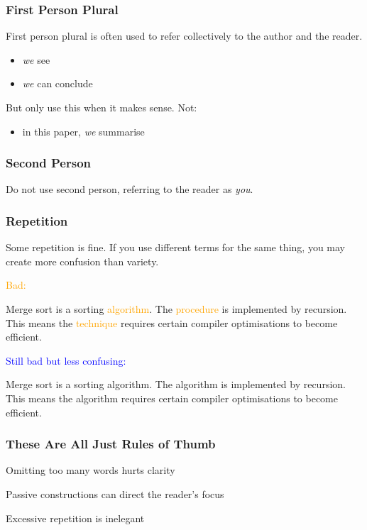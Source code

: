 \documentclass[xetex]{beamer}
\newcommand{\bad}[1]{\textcolor{orange}{#1}}
\newcommand{\good}[1]{\textcolor{blue}{#1}}
\begin{document}
\begin{frame}
  \frametitle{First Person Plural}

  First person plural is often used to refer collectively to the author and the reader.
  \begin{itemize}
    \item \emph{we} see
    \item \emph{we} can conclude
  \end{itemize}

  \medskip
  \pause

  But only use this when it makes sense. Not:
  \begin{itemize}
    \item in this paper, \emph{we} summarise
  \end{itemize}
\end{frame}

\begin{frame}
  \frametitle{Second Person}

  Do not use second person, referring to the reader as \emph{you}.
\end{frame}

\begin{frame}
  \frametitle{Repetition}

  Some repetition is fine.
  If you use different terms for the same thing, you may create more confusion than variety.

  \medskip
  \pause

  \bad{Bad:}

  {
    \small
    Merge sort is a sorting \bad{algorithm}.
    The \bad{procedure} is implemented by recursion.
    This means the \bad{technique} requires certain compiler optimisations to become efficient.
  }

  \medskip
  \pause

  \good{Still bad but less confusing:}

  {
    \small
    Merge sort is a sorting algorithm.
    The algorithm is implemented by recursion.
    This means the algorithm requires certain compiler optimisations to become efficient.
  }
\end{frame}

\begin{frame}
  \frametitle{These Are All Just Rules of Thumb}

  Omitting too many words hurts clarity

  \medskip
  \pause

  Passive constructions can direct the reader's focus

  \medskip
  \pause

  Excessive repetition is inelegant
\end{frame}
\end{document}
